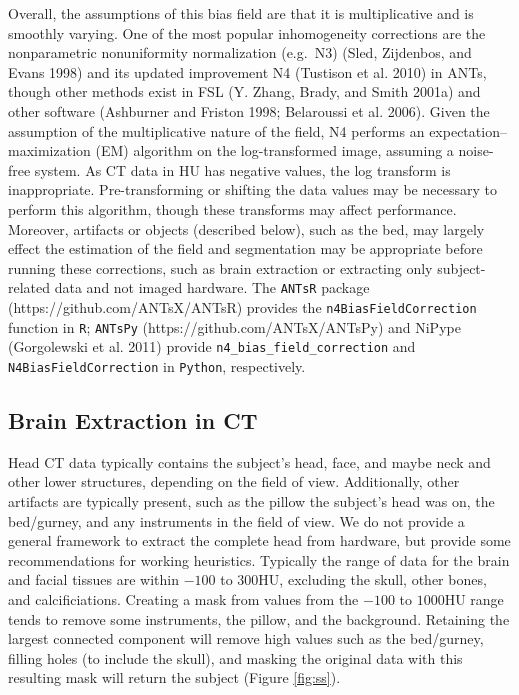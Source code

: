 \documentclass[]{elsarticle} %
\begin{document}
Overall, the assumptions of this bias field are that it is multiplicative and is smoothly varying. One of the most popular inhomogeneity corrections are the nonparametric nonuniformity normalization (e.g.~N3) (Sled, Zijdenbos, and Evans 1998) and its updated improvement N4 (Tustison et al. 2010) in ANTs, though other methods exist in FSL (Y. Zhang, Brady, and Smith 2001a) and other software (Ashburner and Friston 1998; Belaroussi et al. 2006). Given the assumption of the multiplicative nature of the field, N4 performs an expectation--maximization (EM) algorithm on the log-transformed image, assuming a noise-free system. As CT data in HU has negative values, the log transform is inappropriate. Pre-transforming or shifting the data values may be necessary to perform this algorithm, though these transforms may affect performance. Moreover, artifacts or objects (described below), such as the bed, may largely effect the estimation of the field and segmentation may be appropriate before running these corrections, such as brain extraction or extracting only subject-related data and not imaged hardware. The \texttt{ANTsR} package (https://github.com/ANTsX/ANTsR) provides the \texttt{n4BiasFieldCorrection} function in \texttt{R}; \texttt{ANTsPy} (https://github.com/ANTsX/ANTsPy) and NiPype (Gorgolewski et al. 2011) provide \texttt{n4\_bias\_field\_correction} and
\texttt{N4BiasFieldCorrection} in \texttt{Python}, respectively.

\hypertarget{brain-extraction-in-ct}{%
\subsection{Brain Extraction in CT}\label{brain-extraction-in-ct}}

Head CT data typically contains the subject's head, face, and maybe neck and other lower structures, depending on the field of view. Additionally, other artifacts are typically present, such as the pillow the subject's head was on, the bed/gurney, and any instruments in the field of view. We do not provide a general framework to extract the complete head from hardware, but provide some recommendations for working heuristics. Typically the range of data for the brain and facial tissues are within \(-100\) to \(300\)HU, excluding the skull, other bones, and calcificiations. Creating a mask from values from the \(-100\) to \(1000\)HU range tends to remove some instruments, the pillow, and the background. Retaining the largest connected component will remove high values such as the bed/gurney, filling holes (to include the skull), and masking the original data with this resulting mask will return the subject (Figure \ref{fig:ss}).
\end{document}
